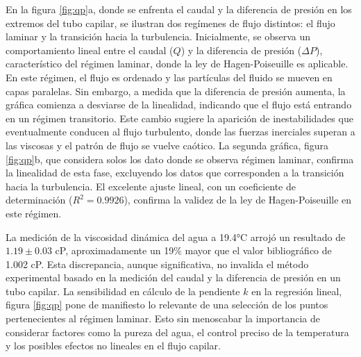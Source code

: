 	En  la figura \ref{fig:qp}a, donde se enfrenta el caudal y la diferencia de presión en los extremos del tubo capilar, se ilustran dos regímenes de flujo distintos: el flujo laminar y la transición hacia la turbulencia. Inicialmente, se observa un comportamiento lineal entre el caudal (\( Q \)) y la diferencia de presión (\( \Delta P \)), característico del régimen laminar, donde la ley de Hagen-Poiseuille es aplicable. En este régimen, el flujo es ordenado y las partículas del fluido se mueven en capas paralelas. Sin embargo, a medida que la diferencia de presión aumenta, la gráfica comienza a desviarse de la linealidad, indicando que el flujo está entrando en un régimen transitorio. Este cambio sugiere la aparición de inestabilidades que eventualmente conducen al flujo turbulento, donde las fuerzas inerciales superan a las viscosas y el patrón de flujo se vuelve caótico. La segunda gráfica, figura \ref{fig:qp}b, que considera solos los dato donde se observa régimen laminar, confirma la linealidad de esta fase, excluyendo los datos que corresponden a la transición hacia la turbulencia. El excelente ajuste lineal, con un coeficiente de determinación ($R^2=0.9926$), confirma la validez de la ley de Hagen-Poiseuille en este régimen.
	
	\vspace{\baselineskip}
	
	La medición de la viscosidad dinámica del agua a 19.4°C arrojó un resultado de $1.19\pm0.03$ cP, aproximadamente un 19\% mayor que el valor bibliográfico  de 1.002 cP. Esta discrepancia, aunque significativa, no invalida el método experimental basado en la medición del caudal y la diferencia de presión en un tubo capilar. La sensibilidad en cálculo de la pendiente  $k$ en la regresión lineal, figura \ref{fig:qp} pone de manifiesto lo relevante de una selección de los puntos pertenecientes al  régimen laminar. Esto sin menoscabar la importancia de considerar factores como la pureza del agua, el control preciso de la temperatura y los posibles efectos no lineales en el flujo capilar. 
	
	\vspace{\baselineskip}
	
